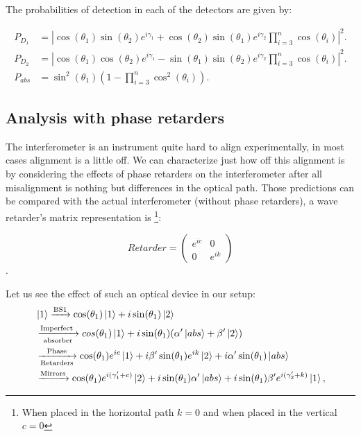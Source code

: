\documentclass{book}
\begin{document}
The probabilities of detection in each of the detectors are given by:

\begin{align}
P_{D_{1}}&=|\cos(\theta_{1})\sin(\theta_{2})e^{i \gamma_{1}}+\cos(\theta_{2})\sin(\theta_{1})e^{i \gamma_{2}}\prod_{i=3}^{n} \cos(\theta_{i})|^2.\\
P_{D_{2}}&=|\cos(\theta_{1})\cos(\theta_{2})e^{i \gamma_{1}}-\sin(\theta_{1})\sin(\theta_{2})e^{i \gamma_{2}}\prod_{i=3}^{n} \cos(\theta_{i})|^2.\\
P_{abs}&=\sin^2(\theta_{1})\left(1-\prod_{i=3}^{n}\cos^2(\theta_{i})\right).
\end{align}

\subsection{Analysis with phase retarders }

The interferometer is an instrument quite hard to align experimentally, in most cases alignment is a little off. We can characterize just how off this alignment is by considering the effects of phase retarders on the interferometer after all misalignment is nothing but differences in the optical path. Those predictions can be compared with the actual interferometer (without phase retarders), a wave retarder's  matrix representation is \footnote{When placed in the horizontal path $k=0$ and when placed in the vertical $c=0$}:


\begin{equation}
 Retarder=\begin
{pmatrix} e^
{i c} & 0\\0& e^
{i k }\end
{pmatrix}
\end{equation}.

Let us see the effect of such an optical device in our setup:
\begin{align*}
&\ket{1}\xrightarrow{\text{BS1}}\cos(\theta_{1})\ket{1}+i\sin(\theta_{1})\ket{2}\\ &\xrightarrow[\text{absorber}]{\text{Imperfect }}cos(\theta_{1})\ket{1}+i\sin(\theta_{1})(\alpha' \ket{abs} +\beta' \ket{2} )\\& \xrightarrow[\text{Retarders}]{\text{Phase}}\cos(\theta_{1})e^{ic}\ket{1}+i\beta'\sin(\theta_{1}) e^{ik}\ket{2} +i\alpha'\sin(\theta_{1}) \ket{abs}\\ &\xrightarrow{\text{Mirrors}} \cos(\theta_{1})e^{i(\gamma_{1}'+c)}\ket{2}+i \sin(\theta_{1})\alpha'\ket{abs}+i\sin(\theta_{1})\beta'e^{i(\gamma_{2}'+k)}\ket{1},
\end{align*}
\end{document}
